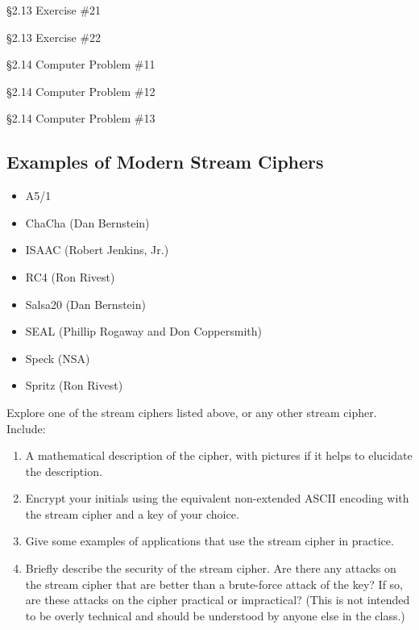 \begin{problem} [10 points]
\S 2.13 Exercise \#21
\end{problem}

\begin{problem} [10 points]
\S 2.13 Exercise \#22
\end{problem}

\begin{problem} [15 points]
\S 2.14 Computer Problem \#11
\end{problem}

\begin{problem} [15 points]
\S 2.14 Computer Problem \#12
\end{problem}

\begin{problem} [15 points]
\S 2.14 Computer Problem \#13
\end{problem}

		\subsection{Examples of Modern Stream Ciphers}

	\begin{itemize}
		\item A5/1
		\item ChaCha (Dan Bernstein)
		\item ISAAC (Robert Jenkins, Jr.)
		\item RC4 (Ron Rivest)
		\item Salsa20 (Dan Bernstein)
		\item SEAL (Phillip Rogaway and Don Coppersmith)
		\item Speck (NSA)
		\item Spritz (Ron Rivest)
	\end{itemize}

\begin{problem} [15 points]
	Explore one of the stream ciphers listed above, or any other stream cipher. Include:
	\begin{enumerate}
		\item A mathematical description of the cipher, with pictures if it helps to elucidate the description.
		\item Encrypt your initials using the equivalent non-extended ASCII encoding with the stream cipher and a key of your choice. %
		\item Give some examples of applications that use the stream cipher in practice.
		\item Briefly describe the security of the stream cipher. Are there any attacks on the stream cipher that are better than a brute-force attack of the key? If so, are these attacks on the cipher practical or impractical? (This is not intended to be overly technical and should be understood by anyone else in the class.)
	\end{enumerate}
\end{problem}

